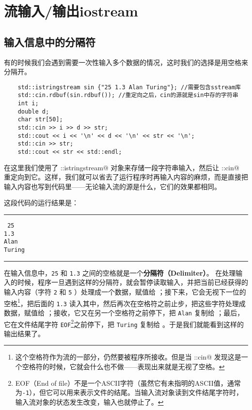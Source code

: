 \section{流输入/输出\textbf{iostream}}
\subsection*{输入信息中的分隔符}
有的时候我们会遇到需要一次性输入多个数据的情况，这时我们的选择是用空格来分隔开。
\begin{lstlisting}
    std::istringstream sin {"25 1.3 Alan Turing"}; //需要包含sstream库
    std::cin.rdbuf(sin.rdbuf()); //重定向之后，cin的源就是sin中存的字符串
    int i;
    double d;
    char str[50];
    std::cin >> i >> d >> str;
    std::cout << i << '\n' << d << '\n' << str << '\n';
    std::cin >> str;
    std::cout << str << std::endl;
\end{lstlisting}
在这里我们使用了 \lstinline@std::istringstream@ 对象来存储一段字符串输入，然后让 \lstinline@std::cin@ 重定向到它。这样，我们就可以省去了运行程序时再输入内容的麻烦，而是直接把输入内容也写到代码里——无论输入流的源是什么，它们的效果都相同。\par
这段代码的运行结果是：\\\noindent\rule{\linewidth}{.2pt}\texttt{
25\\
1.3\\
Alan\\
Turing
}\\\noindent\rule{\linewidth}{.2pt}\par
在输入信息中，\texttt{25} 和 \texttt{1.3} 之间的空格就是一个\textbf{分隔符（Delimiter）}。 在处理输入的时候，程序一旦遇到这样的分隔符，就会暂停读取输入，并把当前已经获得的输入内容（字符 \texttt{2} 和 \texttt{5} ）处理成一个数据，赋值给 \lstinline@i@；接下来，它会无视下一位的空格\footnote{这个空格符作为流的一部分，仍然要被程序所接收。但是当 \lstinline@std::cin@ 发现这是一个空格符的时候，它就会什么也不做——表现出来就是无视了空格。}，把后面的 \texttt{1.3} 读入其中，然后再次在空格符之前止步，把这些字符处理成数据，赋值给 \lstinline@d@；接收，它又在另一个空格符之前停下，把 \texttt{Alan} 复制给 \lstinline@str@；最后，它在文件结尾字符 \texttt{EOF}\footnote{EOF（End of file）不是一个ASCII字符（虽然它有未指明的ASCII值，通常为\texttt{-1}），但它可以用来表示文件的结尾。当输入流对象读到文件结尾字符时，输入流对象的状态发生改变，输入也就停止了。}之前停下，把 \texttt{Turing} 复制给 \lstinline@str@。于是我们就能看到这样的输出结果了。\par
